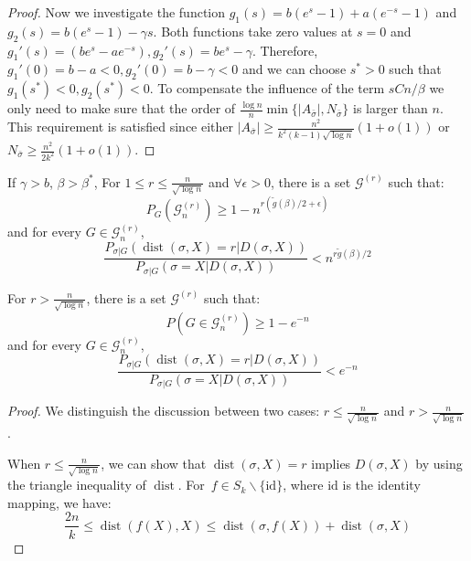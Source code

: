 \documentclass[entropy,article,accept,moreauthors,pdftex]{Definitions/mdpi}
\newcommand{\cG}{\mathcal{G}}
\newcommand{\1}{\mathbbm{1}}
\DeclareMathOperator{\Dist}{dist}
\begin{document}
\begin{paracol}{2}
\begin{proof}
	Now we investigate the function $g_1(s) = b(e^s -1)+ a(e^{-s} - 1)$ and\linebreak $g_2(s) = b(e^s - 1)-\gamma s$.
	Both functions take zero values at $s=0$ and\linebreak $g_1'(s) = (be^s - ae^{-s}), g_2'(s) = be^s -\gamma$.
	Therefore, $g_1'(0) = b-a<0, g_2'(0) = b - \gamma < 0$ and we can choose $s^*>0$ such that $g_1(s^*) < 0,g_2(s^*) < 0$.
	To compensate the influence of the term $sCn/\beta$ we only need to make sure that the order of $\frac{\log n}{n} \min\{|A_{\bar{\sigma}}|, N_{\bar{\sigma}}\}$ is larger than $n$.
	This requirement is satisfied since either $|A_{\bar{\sigma}}|\geq \frac{n^2}{k^2 (k-1)\sqrt{\log n}}(1+o(1))$ or $N_{\bar{\sigma}} \geq \frac{n^2}{2k^2}(1+o(1))$.
\end{proof}
\begin{Lemma}\label{prop:small}
	If $\gamma>b$, $\beta>\beta^\ast$,
	For $1\leq r \leq \frac{n}{\sqrt{\log n}}$
	and $\forall \epsilon > 0$, there is a set $\cG^{(r)}$ such that:
\begin{equation}\label{eq:Gr}
	P_G(\cG^{(r)}_n) \ge 1 - n^{r(\tilde{g}(\beta)/2 + \epsilon)}
	\end{equation}
	and
	for every $G\in\cG^{(r)}_n$,
\begin{equation}\label{eq:psigmaX}
	\frac{P_{\sigma|G}(\Dist(\sigma, X)=r | D(\sigma, X))}
	{P_{\sigma|G}(\sigma=X | D(\sigma, X))} <
	n^{r \tilde{g}(\beta) /2}
	\end{equation}
	
	For $r> \frac{n}{\sqrt{\log n}}$, there is a set $\cG^{(r)}$ such that:
\begin{equation}\label{eq:Gr1}
	P(G\in\cG^{(r)}_n) \ge 1 - e^{-n}
	\end{equation}
	and
	for every $G\in\cG^{(r)}_n$,
\begin{equation}\label{eq:psigmaX1}
	\frac{P_{\sigma|G}(\Dist(\sigma, X)=r | D(\sigma, X))}
	{P_{\sigma|G}(\sigma=X | D(\sigma, X))} <
	e^{-n}
	\end{equation}
\end{Lemma}


\begin{proof}
We distinguish the discussion between two cases: $r\leq \frac{n}{\sqrt{\log n}}$
and $r > \frac{n}{\sqrt{\log n}}$.

When $r\leq \frac{n}{\sqrt{\log n}}$, we can show that $\Dist(\sigma, X) = r$ implies $D(\sigma, X)$ by using the triangle
inequality of $\Dist$. For~$f \in S_k \backslash \{ \textrm{id} \}$, where $\textrm{id}$ is the identity mapping, we have:
$$
\frac{2n}{k} \leq \Dist(f(X), X) \leq \Dist(\sigma, f(X)) + \Dist(\sigma, X)
$$


\end{proof}
\end{paracol}
\end{document}

